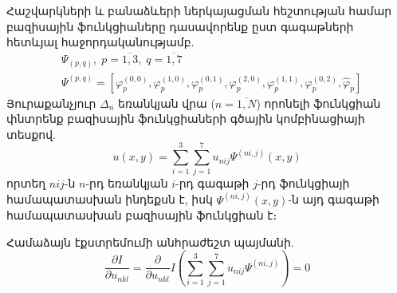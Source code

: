 \documentclass[fleqn, bachelor,subf,12pt,notitlepage]{article}
\begin{document}
Հաշվարկների և բանաձևերի ներկայացման հեշտության համար բազիսային ֆունկցիաները դասավորենք ըստ գագաթների հետևյալ հաջորդականությամբ.
\begin{equation}
\begin{aligned}
&\Psi_{(p, q)}, \; p=\overline{1, 3}, \; q = \overline{1, 7} \\
&\Psi^{(p, q)} = \left[\varphi_{p}^{(0, 0)}, \varphi_{p}^{(1, 0)}, \varphi_{p}^{(0, 1)}, \varphi_{p}^{(2, 0)}, \varphi_{p}^{(1, 1)}, \varphi_{p}^{(0, 2)}, \hat{\varphi}_{p}\right]
\end{aligned}
\end{equation}
Յուրաքանչյուր $\Delta_{n}$ եռանկյան վրա ($n=\overline{1, N}$)  որոնելի ֆունկցիան փնտրենք բազիսային ֆունկցիաների գծային կոմբինացիայի տեսքով.
\begin{equation}
u(x, y) = \sum_{i=1}^{3}\sum_{j=1}^{7}u_{nij}\Psi^{(ni,j)}\left(x,y\right)
\end{equation}
որտեղ $nij$-ն $n$-րդ եռանկյան $i$-րդ գագաթի $j$-րդ ֆունկցիայի համապատասխան ինդեքսն է, իսկ $\Psi^{(ni, j)}(x,y)$-ն այդ գագաթի համապատասխան բազիսային ֆունկցիան է։

Համաձայն էքստրեմումի անհրաժեշտ պայմանի.
\begin{equation}
\dfrac{\partial I}{ \partial u_{nkl}} = \dfrac{\partial}{\partial u_{nkl}} I \left(\sum_{i=1}^{3}\sum_{j=1}^{7}u_{nij}\Psi^{(ni,j)}\right) = 0
\end{equation}
\end{document}
